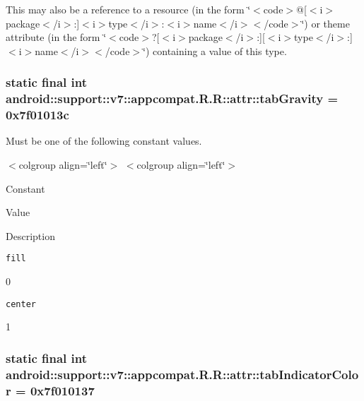This may also be a reference to a resource (in the form \char`\"{}$<$code$>$@\mbox{[}$<$i$>$package$<$/i$>$:\mbox{]}$<$i$>$type$<$/i$>$:$<$i$>$name$<$/i$>$$<$/code$>$\char`\"{}) or theme attribute (in the form \char`\"{}$<$code$>$?\mbox{[}$<$i$>$package$<$/i$>$:\mbox{]}\mbox{[}$<$i$>$type$<$/i$>$:\mbox{]}$<$i$>$name$<$/i$>$$<$/code$>$\char`\"{}) containing a value of this type. \hypertarget{classandroid_1_1support_1_1v7_1_1appcompat_1_1_r_1_1attr_6ee656564ae6799b32a2320a4c7af5c9}{
\subsubsection[{tabGravity}]{\setlength{\rightskip}{0pt plus 5cm}static final int android::support::v7::appcompat.R.R::attr::tabGravity = 0x7f01013c}}
\label{classandroid_1_1support_1_1v7_1_1appcompat_1_1_r_1_1attr_6ee656564ae6799b32a2320a4c7af5c9}


Must be one of the following constant values. \begin{TabularC}{0}
\hline
\end{TabularC}
$<$colgroup align=\char`\"{}left\char`\"{}$>$ $<$colgroup align=\char`\"{}left\char`\"{}$>$ 

Constant

Value

Description 

{\tt fill}

0

{\tt center}

1\hypertarget{classandroid_1_1support_1_1v7_1_1appcompat_1_1_r_1_1attr_81fd5f7612491d44b4a6a9cde0ed59e8}{
\subsubsection[{tabIndicatorColor}]{\setlength{\rightskip}{0pt plus 5cm}static final int android::support::v7::appcompat.R.R::attr::tabIndicatorColor = 0x7f010137}}
\label{classandroid_1_1support_1_1v7_1_1appcompat_1_1_r_1_1attr_81fd5f7612491d44b4a6a9cde0ed59e8}



